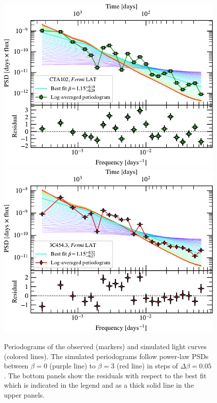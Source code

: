 \documentclass[twocolumn,linenumbers]{aastex62}
\begin{document}
\begin{figure}
    \includegraphics[width = 0.32\linewidth]{figures/periodogram_fermi_CTA102_Nsim_100Next_100Sim_addunc_data_rescale_EM13_usegap_1_PSD_window_none_detrend_none_norm_var_20.pdf}
    \includegraphics[width = 0.32\linewidth]{figures/periodogram_fermi_3C454p3_Nsim_100Next_100Sim_addunc_data_rescale_EM13_usegap_1_PSD_window_none_detrend_none_norm_var_20.pdf}
    \caption{Periodograms of the observed (markers) and simulated light curves (colored lines). The simulated periodograms follow power-law PSDs between $\beta = 0$ (purple line) to $\beta = 3$ (red line) in steps of $\Delta\beta = 0.05$. The bottom panels show the residuals with respect to the best fit which is indicated in the legend and as a thick solid line in the upper panels.}
    \label{fig:periodograms}
\end{figure}
\end{document}
